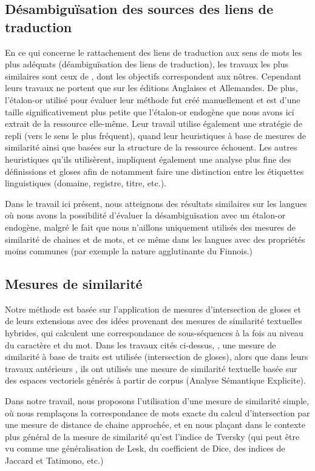 \documentclass[10pt,a4paper,twoside]{article}
\begin{document}
\subsection{Désambiguïsation des sources des liens de traduction} 

En ce qui concerne le rattachement des liens de traduction aux sens de mots les plus adéquats (déambiguïsation des liens de traduction), les travaux les plus similaires sont ceux de \cite{meyer-gurevych:2012:PAPERS}, dont les objectifs correspondent aux nôtres. Cependant leurs travaux ne portent que sur les éditions Anglaises et Allemandes. De plus, l'étalon-or utilisé pour évaluer leur méthode  fut créé manuellement et est d'une taille significativement plus petite que l'étalon-or endogène que nous avons ici extrait de la ressource elle-même.  Leur travail utilise également une stratégie de repli (vers le sens le plus fréquent), quand leur heuristiques à base de mesures de similarité ainsi que basées sur la structure de la ressource échouent.  Les autres heuristiques qu'ils utilisèrent, impliquent également une analyse plus fine des définissions et gloses afin de notamment faire une distinction entre les étiquettes  linguistiques (domaine, registre, titre, etc.).

Dans le travail ici présent, nous atteignons des résultats similaires sur les langues où nous avons la possibilité d'évaluer la désambiguïsation avec un étalon-or endogène, malgré le fait que nous n'aillons uniquement utilisés des mesures de similarité de chaines et de mots, et ce même dans les langues avec des propriétés moins communes (par exemple la nature agglutinante du Finnois.)  

\subsection{Mesures de similarité}
Notre méthode est basée sur l'application de mesures d'intersection de gloses et de leurs extensions avec des idées provenant des mesures de similarité textuelles hybrides, qui calculent une correspondance de sous-séquences à la fois au niveau du caractère et du mot. Dans les travaux cités ci-dessus, \cite{meyer-gurevych:2012:PAPERS}, une mesure de similarité à base de traits est utilisée (intersection de gloses), alors que dans leurs travaux antérieurs \cite{MeyerGurevych:2010}, ils ont utilisés une mesure de similarité textuelle basée sur des espaces vectoriels générés à partir de corpus (Analyse Sémantique Explicite).

Dans notre travail, nous proposons l'utilisation d'une mesure de similarité simple, où nous remplaçons la correspondance de mots exacte du calcul d'intersection par une mesure de distance de chaine approchée, et en nous plaçant dans le contexte plus général de la mesure de similarité qu'est l'indice de Tversky (qui peut être vu comme une généralisation de Lesk, du coefficient de Dice, des indices de Jaccard et Tatimono, etc.)
\end{document}
